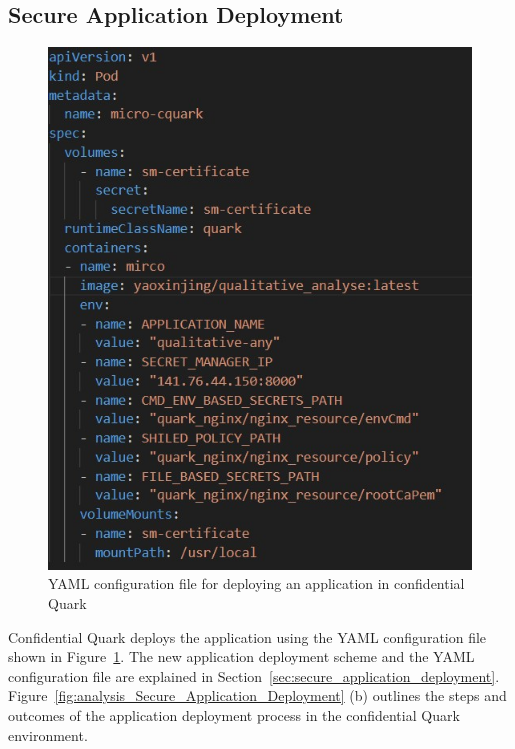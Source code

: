 \subsection{Secure Application Deployment}
\label{sec:eva_qualitativ_secure_depl}
\begin{figure}[!htb]
    \centering
    \includegraphics[height=0.3\textheight]{images/cquark_deploy_yaml.jpg}
    \caption[YAML configuration file for deploying an application in confidential Quark]{YAML configuration file for deploying an application in confidential Quark}
    \label{fig:cquark_deploy_yaml}
\end{figure}

Confidential Quark deploys the application using the YAML configuration file shown in Figure~\ref{fig:cquark_deploy_yaml}. The new application deployment scheme and the YAML configuration file are explained in Section~\ref{sec:secure_application_deployment}. 
Figure~\ref{fig:analysis_Secure_Application_Deployment} (b) outlines the steps and outcomes of the application deployment process in the confidential Quark environment.

